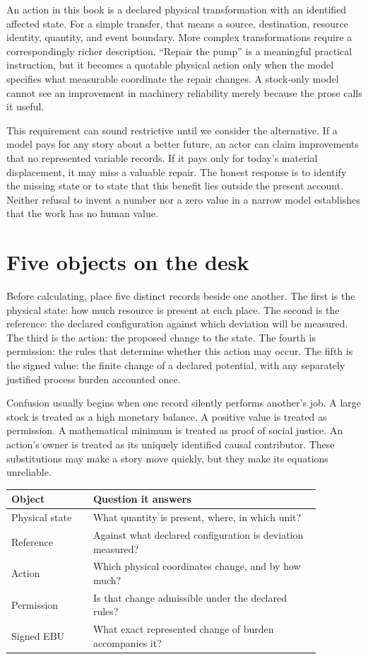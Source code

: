 An action in this book is a declared physical transformation with an identified affected state. For a simple transfer, that means a source, destination, resource identity, quantity, and event boundary. More complex transformations require a correspondingly richer description. ``Repair the pump'' is a meaningful practical instruction, but it becomes a quotable physical action only when the model specifies what measurable coordinate the repair changes. A stock-only model cannot see an improvement in machinery reliability merely because the prose calls it useful.

This requirement can sound restrictive until we consider the alternative. If a model pays for any story about a better future, an actor can claim improvements that no represented variable records. If it pays only for today's material displacement, it may miss a valuable repair. The honest response is to identify the missing state or to state that this benefit lies outside the present account. Neither refusal to invent a number nor a zero value in a narrow model establishes that the work has no human value.

\section{Five objects on the desk}
Before calculating, place five distinct records beside one another. The first is the physical state: how much resource is present at each place. The second is the reference: the declared configuration against which deviation will be measured. The third is the action: the proposed change to the state. The fourth is permission: the rules that determine whether this action may occur. The fifth is the signed value: the finite change of a declared potential, with any separately justified process burden accounted once.

Confusion usually begins when one record silently performs another's job. A large stock is treated as a high monetary balance. A positive value is treated as permission. A mathematical minimum is treated as proof of social justice. An action's owner is treated as its uniquely identified causal contributor. These substitutions may make a story move quickly, but they make its equations unreliable.

\begin{center}
\begin{tabular}{P{0.23\linewidth}P{0.64\linewidth}}
\toprule
Object & Question it answers\\
\midrule
Physical state & What quantity is present, where, in which unit?\\
Reference & Against what declared configuration is deviation measured?\\
Action & Which physical coordinates change, and by how much?\\
Permission & Is that change admissible under the declared rules?\\
Signed EBU & What exact represented change of burden accompanies it?\\
\bottomrule
\end{tabular}
\end{center}

